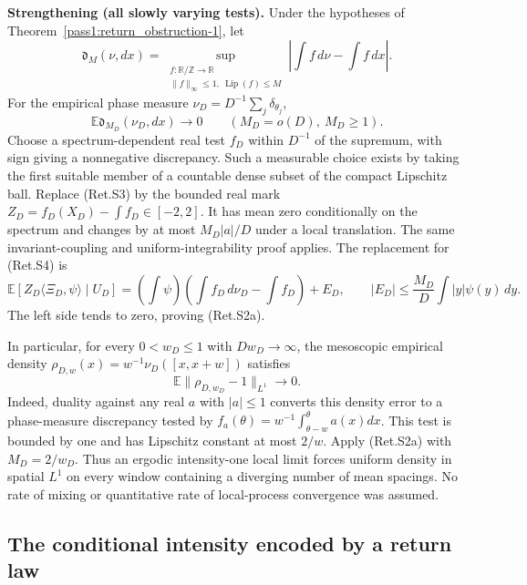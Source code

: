 \textbf{Strengthening (all slowly varying tests).} Under the hypotheses of
Theorem~\ref{pass1:return_obstruction-1}, let
\[
 \mathfrak d_M(\nu,dx)=
 \sup_{\substack{f:\mathbb R/\mathbb Z\to\mathbb R\\
                 \|f\|_\infty\le1,\ \operatorname{Lip}(f)\le M}}
                \left|\int f\,d\nu-\int f\,dx\right|.
\]
For the empirical phase measure \(\nu_D=D^{-1}\sum_j\delta_{\theta_j}\),
\[
             \mathbb E\mathfrak d_{M_D}(\nu_D,dx)\to0
                         \qquad(M_D=o(D),\ M_D\ge1).             \tag{Ret.S2a}
\]
Choose a spectrum-dependent real test \(f_D\) within \(D^{-1}\) of the supremum,
with sign giving a nonnegative discrepancy. Such a measurable choice exists
by taking the first suitable member of a countable dense subset of the
compact Lipschitz ball. Replace (Ret.S3) by the bounded real mark
\(Z_D=f_D(X_D)-\int f_D\in[-2,2]\).
It has mean zero conditionally on the spectrum and changes by at most
\(M_D|a|/D\) under a local translation. The same invariant-coupling and
uniform-integrability proof applies. The replacement for (Ret.S4) is
\[
 \mathbb E[Z_D\langle\Xi_D,\psi\rangle\mid U_D]
 =\left(\int\psi\right)\left(\int f_D\,d\nu_D-\int f_D\right)+E_D,
 \qquad |E_D|\le\frac{M_D}{D}\int |y|\psi(y)\,dy.
\]
The left side tends to zero, proving (Ret.S2a).

In particular, for every \(0<w_D\le1\) with \(Dw_D\to\infty\), the mesoscopic
empirical density \(\rho_{D,w}(x)=w^{-1}\nu_D([x,x+w])\) satisfies
\[
                  \mathbb E\|\rho_{D,w_D}-1\|_{L^1}\to0.        \tag{Ret.S2b}
\]
Indeed, duality against any real \(a\) with \(|a|\le1\) converts this density
error to a phase-measure discrepancy tested by
\(f_a(\theta)=w^{-1}\int_{\theta-w}^{\theta}a(x)dx\).
This test is bounded by one and has Lipschitz constant at most \(2/w\).
Apply (Ret.S2a) with \(M_D=2/w_D\). Thus an ergodic intensity-one local limit
forces uniform density in spatial \(L^1\) on every window containing a
diverging number of mean spacings. No rate of mixing or quantitative rate
of local-process convergence was assumed.

\hypertarget{the-conditional-intensity-encoded-by-a-return-law}{%
\subsection{The conditional intensity encoded by a return law}\label{the-conditional-intensity-encoded-by-a-return-law}}

